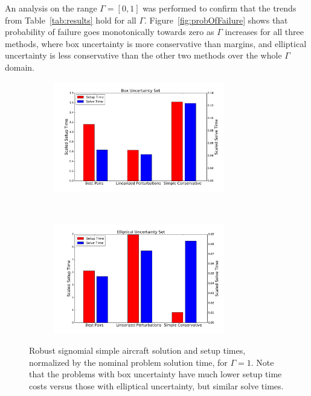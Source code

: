 An analysis on the range $\Gamma=[0,1]$ was performed to confirm that the trends from
Table~\ref{tab:results} hold for all $\Gamma$. Figure~\ref{fig:probOfFailure}
shows that probability of failure goes monotonically
towards zero as $\Gamma$ increases for all three methods, where box uncertainty is
more conservative than margins, and elliptical uncertainty is less conservative
than the other two methods over the whole $\Gamma$ domain.

\begin{figure}[h!]
    \centering
    \captionsetup{justification=centering, font=small}
    \begin{subfigure}{0.49\textwidth}
        \centering
        \includegraphics[height=1.9in]{signomial_simple_flight/box_sst.pdf}
    \end{subfigure}
    ~
    \begin{subfigure}{0.49\textwidth}
        \centering
        \includegraphics[height=1.9in]{signomial_simple_flight/ell_sst.pdf}
    \end{subfigure}
    \caption{Robust signomial simple aircraft solution and setup times, normalized by the
    nominal problem solution time, for $\Gamma = 1$.
    Note that the problems with box uncertainty have much lower setup
    time costs versus those with elliptical uncertainty, but similar solve times.}
    \label{compare_signomial}
\end{figure}


